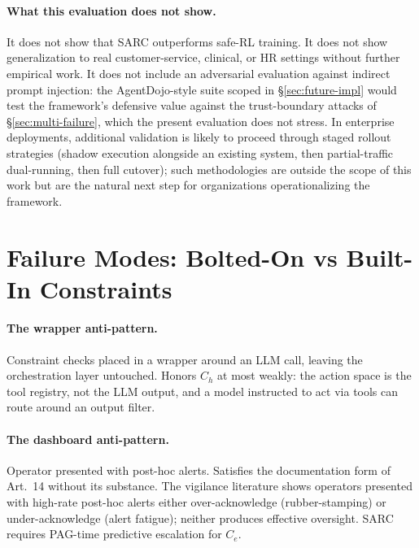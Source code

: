 \documentclass[11pt,a4paper]{article}
\theoremstyle{remark}
\begin{document}
\paragraph{What this evaluation does not show.} It does not show that SARC outperforms safe-RL training. It does not show generalization to real customer-service, clinical, or HR settings without further empirical work. It does not include an adversarial evaluation against indirect prompt injection: the AgentDojo-style suite scoped in \S\ref{sec:future-impl} would test the framework's defensive value against the trust-boundary attacks of \S\ref{sec:multi-failure}, which the present evaluation does not stress. In enterprise deployments, additional validation is likely to proceed through staged rollout strategies (shadow execution alongside an existing system, then partial-traffic dual-running, then full cutover); such methodologies are outside the scope of this work but are the natural next step for organizations operationalizing the framework.

\section{Failure Modes: Bolted-On vs Built-In Constraints}\label{sec:bolted}

\paragraph{The wrapper anti-pattern.} Constraint checks placed in a wrapper around an LLM call, leaving the orchestration layer untouched. Honors $C_h$ at most weakly: the action space is the tool registry, not the LLM output, and a model instructed to act via tools can route around an output filter.

\paragraph{The dashboard anti-pattern.} Operator presented with post-hoc alerts. Satisfies the documentation form of Art.~14 without its substance. The vigilance literature \cite{parasuraman1997vigilance,anaby2024alertfatigue} shows operators presented with high-rate post-hoc alerts either over-acknowledge (rubber-stamping) or under-acknowledge (alert fatigue); neither produces effective oversight. SARC requires PAG-time predictive escalation for $C_e$.
\end{document}
